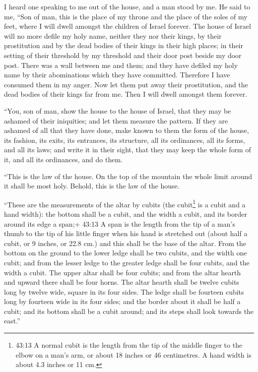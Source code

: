 I heard one speaking to me out of the house, and a man
stood by me.  He said to me, ``Son of man, this is the place
of my throne and the place of the soles of my feet, where I will dwell
amongst the children of Israel forever. The house of Israel will no more
defile my holy name, neither they nor their kings, by their prostitution
and by the dead bodies of their kings in their high places; 
in their setting of their threshold by my threshold and their door post
beside my door post. There was a wall between me and them; and they have
defiled my holy name by their abominations which they have committed.
Therefore I have consumed them in my anger.  Now let them
put away their prostitution, and the dead bodies of their kings far from
me. Then I will dwell amongst them forever.

 ``You, son of man, show the house to the house of Israel,
that they may be ashamed of their iniquities; and let them measure the
pattern.  If they are ashamed of all that they have done,
make known to them the form of the house, its fashion, its exits, its
entrances, its structure, all its ordinances, all its forms, and all its
laws; and write it in their sight, that they may keep the whole form of
it, and all its ordinances, and do them.

 ``This is the law of the house. On the top of the mountain
the whole limit around it shall be most holy. Behold, this is the law of
the house.

 ``These are the measurements of the altar by cubits (the
cubit\footnote{43:13 A normal cubit is the length from the tip of the
  middle finger to the elbow on a man's arm, or about 18 inches or 46
  centimetres. A hand width is about 4.3 inches or 11 cm.} is a cubit
and a hand width): the bottom shall be a cubit, and the width a cubit,
and its border around its edge a span;+ 43:13 A span is the length from
the tip of a man's thumb to the tip of his little finger when his hand
is stretched out (about half a cubit, or 9 inches, or 22.8 cm.) and this
shall be the base of the altar.  From the bottom on the
ground to the lower ledge shall be two cubits, and the width one cubit;
and from the lesser ledge to the greater ledge shall be four cubits, and
the width a cubit.  The upper altar shall be four cubits;
and from the altar hearth and upward there shall be four horns.
 The altar hearth shall be twelve cubits long by twelve
wide, square in its four sides.  The ledge shall be
fourteen cubits long by fourteen wide in its four sides; and the border
about it shall be half a cubit; and its bottom shall be a cubit around;
and its steps shall look towards the east.''

